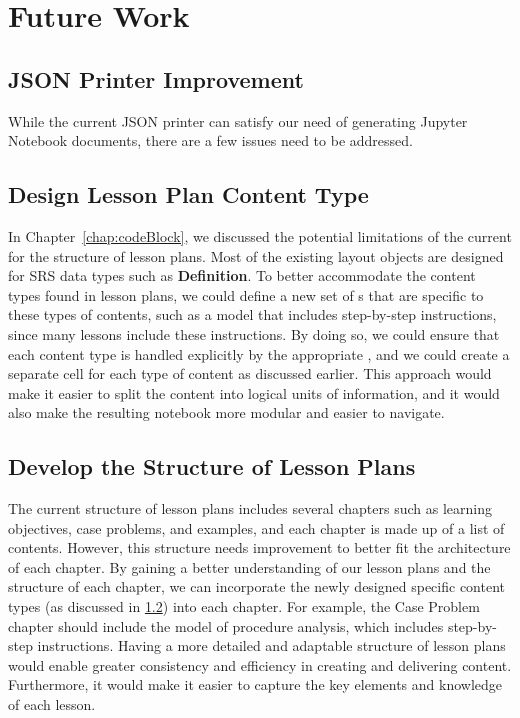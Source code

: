 \chapter{Future Work} \label{chap:futureWork}
\section{JSON Printer Improvement}
While the current JSON printer can satisfy our need of generating Jupyter 
Notebook documents, there are a few issues need to be addressed. 

\section{Design Lesson Plan Content Type} \label{chap:contentType}
In Chapter~\ref{chap:codeBlock}, we discussed the potential limitations of the 
current  for the structure of lesson plans. Most of the 
existing layout objects are designed for SRS data types such as 
\textbf{Definition}. To better accommodate the content types found in lesson 
plans, we could define a new set of s that are specific to 
these types of contents, such as a model that includes step-by-step 
instructions, since many lessons include these instructions. By doing so, we 
could ensure that each content type is handled explicitly by the appropriate 
, and we could create a separate cell for each type of 
content as discussed earlier. This approach would make it easier to split the 
content into logical units of information, and it would also make the resulting 
notebook more modular and easier to navigate.

\section{Develop the Structure of Lesson Plans}
The current structure of lesson plans includes several chapters such as 
learning objectives, case problems, and examples, and each chapter is made up 
of a list of contents. However, this structure needs improvement to better fit 
the architecture of each chapter. By gaining a better understanding of our 
lesson plans and the structure of each chapter, we can incorporate the newly 
designed specific content types (as discussed in \ref{chap:contentType}) into 
each chapter. For example, the Case Problem chapter should include the model of 
procedure analysis, which includes step-by-step instructions. Having a more 
detailed and adaptable structure of lesson plans would enable greater 
consistency and efficiency in creating and delivering content. Furthermore, it 
would make it easier to capture the key elements and knowledge of each lesson.